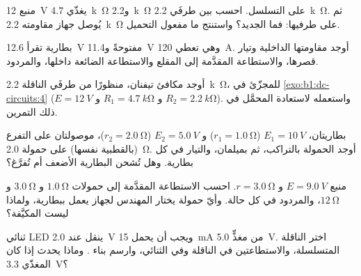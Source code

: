 \begin{exercise}[$\star$]\label{exo:b1:dc-circuits:4}
منبع \qty{12}{V} يغذّي \qty{4.7}{k\ohm} و\qty{2.2}{k\ohm} على
التسلسل. احسب  بين طرفَي \qty{2.2}{k\ohm}. ثم يُوصل جهاز
مقاومته \qty{2.2}{k\ohm} على طرفيها: فما  الجديد؟
واستنتج ما مفعول التحميل.
\end{exercise}

\begin{exercise}[$\star\star$]\label{exo:b1:dc-circuits:5}
بطارية تقرأ \qty{12.6}{V} مفتوحةً و\qty{11.4}{V} وهي تعطي
\qty{120}{A}. أوجد مقاومتها الداخلية وتيار قصرها،
والاستطاعة المقدَّمة إلى المقلع والاستطاعة الضائعة داخلها،
والمردود.
\end{exercise}

\begin{exercise}[$\star\star$]\label{exo:b1:dc-circuits:6}
أوجد مكافئ تيفنان، منظورًا من طرفَي الناقلة \qty{2.2}{k\ohm}،
للمجزّئ في \cref{exo:b1:dc-circuits:4}
($E = \qty{12}{V}$ و $R_1 = \qty{4.7}{k\ohm}$ و $R_2 = \qty{2.2}{k\ohm}$).
واستعمله لاستعادة  المحمَّل في ذلك التمرين.
\end{exercise}

\begin{exercise}[$\star\star$]\label{exo:b1:dc-circuits:7}
بطاريتان، $E_1 = \qty{10}{V}$ ($r_1 = \qty{1.0}{\ohm}$) و
$E_2 = \qty{5.0}{V}$ ($r_2 = \qty{2.0}{\ohm}$)، موصولتان على
التفرع (بالقطبية نفسها) على حمولة \qty{2.0}{\ohm}. أوجد 
الحمولة بالتراكب، ثم بميلمان، والتيار في كل
بطارية. وهل تُشحن البطارية الأضعف أم تُفرَّغ؟
\end{exercise}

\begin{exercise}[$\star\star$]\label{exo:b1:dc-circuits:8}
منبع $E = \qty{9.0}{V}$ و $r = \qty{3.0}{\ohm}$. احسب الاستطاعة
المقدَّمة إلى حمولات $\qty{1.0}{\ohm}$ و $\qty{3.0}{\ohm}$ و $\qty{12}{\ohm}$،
والمردود في كل حالة. وأيّ حمولة يختار المهندس
لجهاز يعمل ببطارية، ولماذا ليست المكيَّفة؟
\end{exercise}

\begin{exercise}[$\star\star$]\label{exo:b1:dc-circuits:9}
ثنائي LED ينقل عند \qty{2.0}{V} ويجب أن يحمل \qty{15}{mA} من
مغذٍّ \qty{5.0}{V}. اختر الناقلة المتسلسلة، والاستطاعتين في
الناقلة وفي الثنائي، وارسم بناء . وماذا
يحدث إذا كان المغذّي \qty{3.3}{V}؟
\end{exercise}

